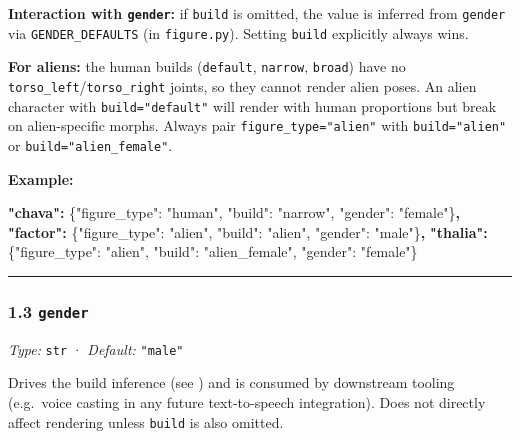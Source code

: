 \documentclass[
  11pt,
]{book}
\newenvironment{Shaded}{}{}
\newcommand{\DataTypeTok}[1]{\textcolor[rgb]{0.56,0.13,0.00}{#1}}
\newcommand{\ErrorTok}[1]{\textcolor[rgb]{1.00,0.00,0.00}{\textbf{#1}}}
\newcommand{\FunctionTok}[1]{\textcolor[rgb]{0.02,0.16,0.49}{#1}}
\newcommand{\StringTok}[1]{\textcolor[rgb]{0.25,0.44,0.63}{#1}}
\begin{document}
\textbf{Interaction with \texttt{gender}:} if \texttt{build} is omitted,
the value is inferred from \texttt{gender} via \texttt{GENDER\_DEFAULTS}
(in \texttt{figure.py}). Setting \texttt{build} explicitly always wins.

\textbf{For aliens:} the human builds (\texttt{default},
\texttt{narrow}, \texttt{broad}) have no
\texttt{torso\_left}/\texttt{torso\_right} joints, so they cannot render
alien poses. An alien character with \texttt{build="default"} will
render with human proportions but break on alien-specific morphs. Always
pair \texttt{figure\_type="alien"} with \texttt{build="alien"} or
\texttt{build="alien\_female"}.

\textbf{Example:}

\begin{Shaded}
\begin{Highlighting}[]
\ErrorTok{"chava":}  \FunctionTok{\{}\DataTypeTok{"figure\_type"}\FunctionTok{:} \StringTok{"human"}\FunctionTok{,} \DataTypeTok{"build"}\FunctionTok{:} \StringTok{"narrow"}\FunctionTok{,} \DataTypeTok{"gender"}\FunctionTok{:} \StringTok{"female"}\FunctionTok{\}}\ErrorTok{,}
\ErrorTok{"factor":} \FunctionTok{\{}\DataTypeTok{"figure\_type"}\FunctionTok{:} \StringTok{"alien"}\FunctionTok{,} \DataTypeTok{"build"}\FunctionTok{:} \StringTok{"alien"}\FunctionTok{,}  \DataTypeTok{"gender"}\FunctionTok{:} \StringTok{"male"}\FunctionTok{\}}\ErrorTok{,}
\ErrorTok{"thalia":} \FunctionTok{\{}\DataTypeTok{"figure\_type"}\FunctionTok{:} \StringTok{"alien"}\FunctionTok{,} \DataTypeTok{"build"}\FunctionTok{:} \StringTok{"alien\_female"}\FunctionTok{,} \DataTypeTok{"gender"}\FunctionTok{:} \StringTok{"female"}\FunctionTok{\}}
\end{Highlighting}
\end{Shaded}

\begin{center}\rule{0.5\linewidth}{0.5pt}\end{center}

\subsubsection{\texorpdfstring{1.3
\texttt{gender}}{1.3 gender}}\label{gender}

\emph{Type:} \texttt{str} · \emph{Default:} \texttt{"male"}

Drives the build inference (see \cite{build})
and is
consumed by downstream tooling (e.g.~voice casting in any future
text-to-speech integration). Does not directly affect rendering unless
\texttt{build} is also omitted.
\end{document}
